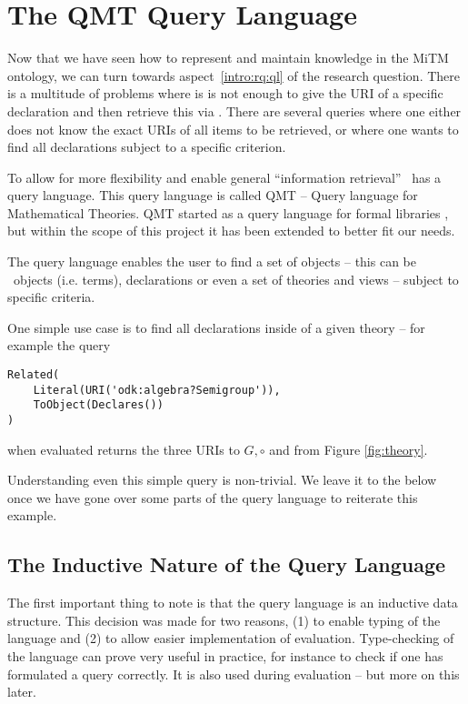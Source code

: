 \section{The QMT Query Language}\label{sec:qmt}

Now that we have seen how to represent and maintain knowledge in the MiTM ontology, we can turn towards aspect~\ref{intro:rq:ql} of the research question.  
There is a multitude of problems where is is not enough to give the URI of a specific declaration and then retrieve this via \mmt. 
There are several queries where one either does not know the exact URIs of all items to be retrieved, or where one wants to find all declarations subject to a specific criterion. 

To allow for more flexibility and enable general ``information retrieval'' \mmt\ has a query language.
This query language is called QMT -- Query language for Mathematical Theories.  
QMT started as a query language for formal libraries \cite{Rabe:qlfml12}, but within the scope of this project it has been extended to better fit our needs.

The query language enables the user to find a set of objects -- this can be \mmt\ objects (i.e. terms), declarations or even a set of theories and views -- subject to specific criteria.
\begin{example}\label{example:simple}
	One simple use case is to find all declarations inside of a given theory -- for example the query
	\begin{lstlisting}[language=qmt]
Related(
	Literal(URI('odk:algebra?Semigroup')),
	ToObject(Declares())
)
	\end{lstlisting}
	when evaluated returns the three URIs to $G, \circ$ and  from Figure \ref{fig:theory}.
\end{example}
Understanding even this simple query is non-trivial. 
We leave it to the below once we have gone over some parts of the query language to reiterate this example.

\subsection{The Inductive Nature of the Query Language}\label{sec:qmt:inductive}

The first important thing to note is that the query language is an inductive data structure.
This decision was made for two reasons, (1) to enable typing of the language and (2) to allow easier implementation of evaluation.
Type-checking of the language can prove very useful in practice, for instance to check if one has formulated a query correctly. 
It is also used during evaluation -- but more on this later.

